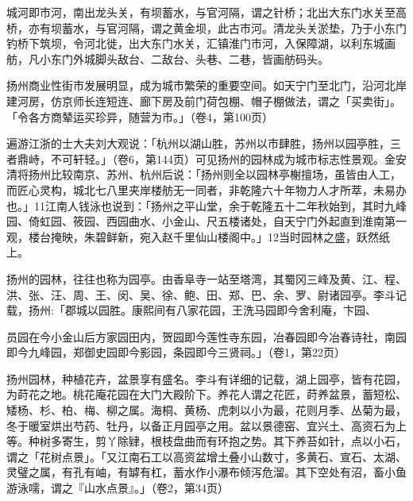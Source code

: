 城河即市河，南出龙头关，有坝蓄水，与官河隔，谓之针桥；北出大东门水关至高桥，亦有坝蓄水，与官河隔，谓之黄金坝，此古市河。清龙头关淤垫，乃于小东门钓桥下筑坝，令河北徙，出大东门水关，汇镇淮门市河，入保障湖，以利东城画舫，凡小东门外城脚头敌台、二敌台、头巷、二巷，皆画舫码头。

扬州商业性街市发展明显，成为城市繁荣的重要空间。如天宁门至北门，沿河北岸建河房，仿京师长连短连、廊下房及前门荷包棚、帽子棚做法，谓之「买卖街」。「令各方商辇运买珍异，随营为市。」（卷4，第100页）


遍游江浙的士大夫刘大观说：「杭州以湖山胜，苏州以市肆胜，扬州以园亭胜，三者鼎峙，不可轩轻。」（卷6，第144页）可见扬州的园林成为城市标志性景观。金安清将扬州比较南京、苏州、杭州后说：「扬州则全以园林亭榭擅场，虽皆由人工，而匠心灵构，城北七八里夹岸楼舫无一同者，非乾隆六十年物力人才所萃，未易办也。」11江南人钱泳也说到：「扬州之平山堂，余于乾隆五十二年秋始到，其时九峰园、倚虹园、筱园、西园曲水、小金山、尺五楼诸处，自天宁门外起直到淮南第一观，楼台掩映，朱碧鲜新，宛入赵千里仙山楼阁中。」12当时园林之盛，跃然纸上。

扬州的园林，往往也称为园亭。由香阜寺一站至塔湾，其蜀冈三峰及黄、江、程、洪、张、汪、周、王、闵、吴、徐、鲍、田、郑、巴、余、罗、尉诸园亭。李斗记载，扬州:「郡城以园胜。康熙间有八家花园，王洗马园即今舍利庵，卞园、

\vfill
\begin{BookNotes}
\end{BookNotes}

\noindent 员园在今小金山后方家园田内，贺园即今莲性寺东园，冶春园即今冶春诗社，南园即今九峰园，郑御史园即今影园，条园即今三贤祠。」（卷1，第22页）

扬州园林，种植花卉，盆景享有盛名。李斗有详细的记载，湖上园亭，皆有花园，为莳花之地。桃花庵花园在大门大殿阶下。养花人谓之花匠，莳养盆景，蓄短松、矮杨、杉、柏、梅、柳之属。海桐、黄杨、虎刺以小为最，花则月季、丛菊为最，冬于暖室烘出芍药、牡丹，以备正月园亭之用。盆以景德窑、宜兴土、高资石为上等。种树多寄生，剪丫除肄，根枝盘曲而有环抱之势。其下养苔如针，点以小石，谓之「花树点景」。「又江南石工以高资盆增土叠小山数寸，多黄石、宣石、太湖、灵璧之属，有孔有岫，有罅有杠，蓄水作小瀑布倾泻危溜。其下空处有沼，畜小鱼游泳嚅，谓之『山水点景』。」（卷2，第34页）

